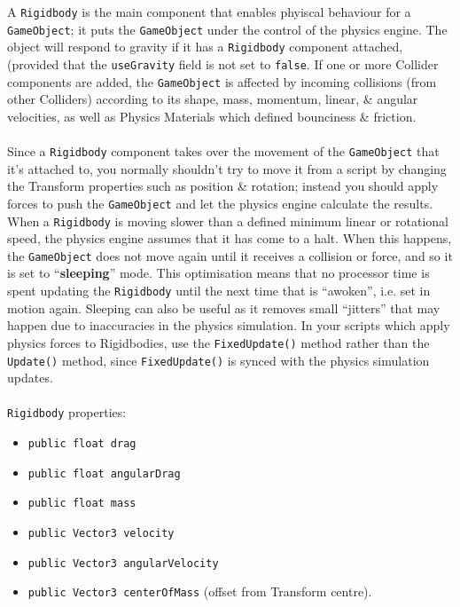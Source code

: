 \documentclass[a4paper,11pt]{article}
\begin{document}
A \verb|Rigidbody| is the main component that enables phyiscal behaviour for a \verb|GameObject|;
it puts the \verb|GameObject| under the control of the physics engine.
The object will respond to gravity if it has a \verb|Rigidbody| component attached, (provided that the \verb|useGravity| 
field is not set to \verb|false|.
If one or more Collider components are added, the \verb|GameObject| is affected by incoming collisions (from other Colliders)
according to its shape, mass, momentum, linear, \& angular velocities, as well as Physics Materials which defined 
bounciness \& friction.
\\\\
Since a \verb|Rigidbody| component takes over the movement of the \verb|GameObject| that it's attached to, you normally
shouldn't try to move it from a script by changing the Transform properties such as position \& rotation; instead you 
should apply forces to push the \verb|GameObject| and let the physics engine calculate the results.
When a \verb|Rigidbody| is moving slower than a defined minimum linear or rotational speed, the physics engine assumes
that it has come to a halt.
When this happens, the \verb|GameObject| does not move again until it receives a collision or force, and so it is set to 
``\textbf{sleeping}'' mode.
This optimisation means that no processor time is spent updating the \verb|Rigidbody| until the next time that is 
``awoken'', i.e. set in motion again.
Sleeping can also be useful as it removes small ``jitters'' that may happen due to inaccuracies in the physics simulation.
In your scripts which apply physics forces to Rigidbodies, use the \verb|FixedUpdate()| method rather than the
\verb|Update()| method, since \verb|FixedUpdate()| is synced with the physics simulation updates.
\\\\ 
\verb|Rigidbody| properties:
\begin{itemize}
    \item   \texttt{public float drag}
    \item   \texttt{public float angularDrag}
    \item   \texttt{public float mass}
    \item   \texttt{public Vector3 velocity}
    \item   \texttt{public Vector3 angularVelocity}
    \item   \texttt{public Vector3 centerOfMass} (offset from Transform centre).
\end{itemize}
\end{document}
